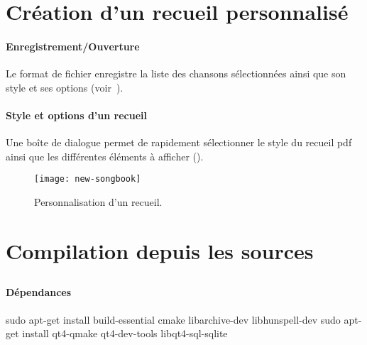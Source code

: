 \section{Création d'un recueil personnalisé}

\paragraph{Enregistrement/Ouverture}
Le format de fichier  enregistre la liste des chansons
sélectionnées ainsi que son style et ses options
(voir~).

\paragraph{Style et options d'un recueil}
Une boîte de dialogue permet de rapidement sélectionner le style du
recueil pdf ainsi que les différentes éléments à afficher
().

\begin{figure}
  \centering
  \texttt{[image: new-songbook]}
  \caption{Personnalisation d'un recueil.}
  \label{fig:new-songbook}
\end{figure}

\section{Compilation depuis les sources}

\subsection{\linux}

\paragraph{Dépendances}

\begin{unix}
  sudo apt-get install build-essential cmake libarchive-dev libhunspell-dev
  sudo apt-get install qt4-qmake qt4-dev-tools libqt4-sql-sqlite
\end{unix}

